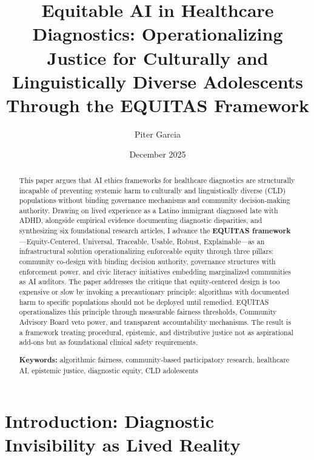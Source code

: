 \documentclass[12pt,a4paper]{article}
\title{\textbf{Equitable AI in Healthcare Diagnostics: Operationalizing Justice for Culturally and Linguistically Diverse Adolescents Through the EQUITAS Framework}}
\author{Piter Garcia}
\date{December 2025}
\begin{document}
\maketitle

\begin{abstract}
This paper argues that AI ethics frameworks for healthcare diagnostics are structurally incapable of preventing systemic harm to culturally and linguistically diverse (CLD) populations without binding governance mechanisms and community decision-making authority. Drawing on lived experience as a Latino immigrant diagnosed late with ADHD, alongside empirical evidence documenting diagnostic disparities, and synthesizing six foundational research articles, I advance the \textbf{EQUITAS framework}—Equity-Centered, Universal, Traceable, Usable, Robust, Explainable—as an infrastructural solution operationalizing enforceable equity through three pillars: community co-design with binding decision authority, governance structures with enforcement power, and civic literacy initiatives embedding marginalized communities as AI auditors. The paper addresses the critique that equity-centered design is too expensive or slow by invoking a precautionary principle: algorithms with documented harm to specific populations should not be deployed until remedied. EQUITAS operationalizes this principle through measurable fairness thresholds, Community Advisory Board veto power, and transparent accountability mechanisms. The result is a framework treating procedural, epistemic, and distributive justice not as aspirational add-ons but as foundational clinical safety requirements.

\noindent \textbf{Keywords:} algorithmic fairness, community-based participatory research, healthcare AI, epistemic justice, diagnostic equity, CLD adolescents
\end{abstract}

\newpage
\tableofcontents
\newpage

\section{Introduction: Diagnostic Invisibility as Lived Reality}
\end{document}

